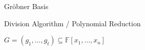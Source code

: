 \documentclass{beamer}
\newcommand{\Field}{\mathbb{F}}
\newcommand{\mpolyring}[3]{#1[#2_{1}, \ldots, #2_{#3}]}
\newcommand{\Grobner}{Gr\"{o}bner }
\begin{document}
\begin{section}{\Grobner Basis}

  \begin{frame}{Division Algorithm / Polynomial Reduction}

    $G = (g_1, \ldots, g_t) \subseteq \mpolyring{\Field}{x}{n}$


\end{frame}
\end{section}
\end{document}
